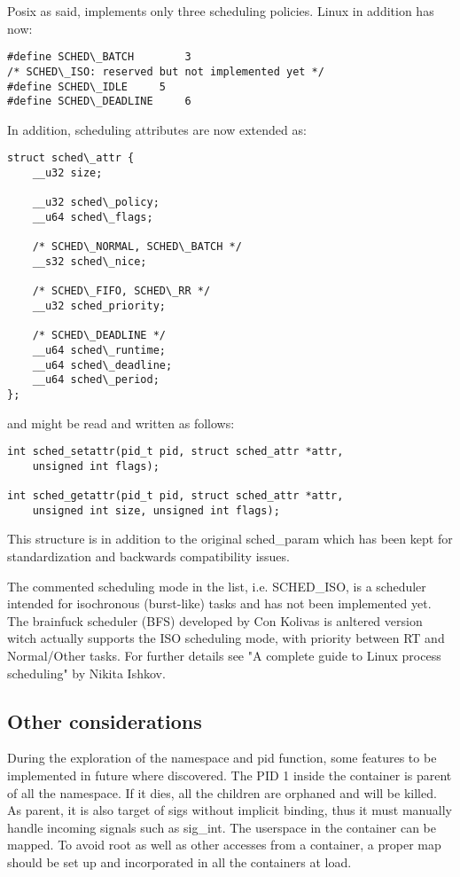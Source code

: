 \documentclass[]{scrartcl}
\begin{document}
Posix as said, implements only three scheduling policies.
Linux in addition has now:

\begin{verbatim}
#define SCHED\_BATCH		3
/* SCHED\_ISO: reserved but not implemented yet */
#define SCHED\_IDLE		5
#define SCHED\_DEADLINE		6
\end{verbatim}


In addition, scheduling attributes are now extended as:

\begin{verbatim}
struct sched\_attr {
	__u32 size;
	
	__u32 sched\_policy;
	__u64 sched\_flags;
	
	/* SCHED\_NORMAL, SCHED\_BATCH */
	__s32 sched\_nice;
	
	/* SCHED\_FIFO, SCHED\_RR */
	__u32 sched_priority;
	
	/* SCHED\_DEADLINE */
	__u64 sched\_runtime;
	__u64 sched\_deadline;
	__u64 sched\_period;
};
\end{verbatim}

and might be read and written as follows:


\begin{verbatim}
int sched_setattr(pid_t pid, struct sched_attr *attr,
	unsigned int flags);

int sched_getattr(pid_t pid, struct sched_attr *attr,
	unsigned int size, unsigned int flags);
\end{verbatim}

This structure is in addition to the original sched\_param which has been kept for standardization and backwards compatibility issues.

The commented scheduling mode in the list, i.e. SCHED\_ISO, is a scheduler intended for isochronous (burst-like) tasks and has not been implemented yet. 
The brainfuck scheduler (BFS) developed by Con Kolivas is anltered version witch actually supports the ISO scheduling mode, with priority between RT and Normal/Other tasks.
For further details see "A complete guide to Linux process scheduling"  by Nikita Ishkov.


\subsection{Other considerations}

During the exploration of the namespace and pid function, some features to be implemented in future where discovered. 
The PID 1 inside the container is parent of all the namespace. If it dies, all the children are orphaned and will be killed. As parent, it is also target of sigs without implicit binding, thus it must manually handle incoming signals such as sig\_int.
The userspace in the container can be mapped. To avoid root as well as other accesses from a container, a proper map should be set up and incorporated in all the containers at load.
\end{document}
